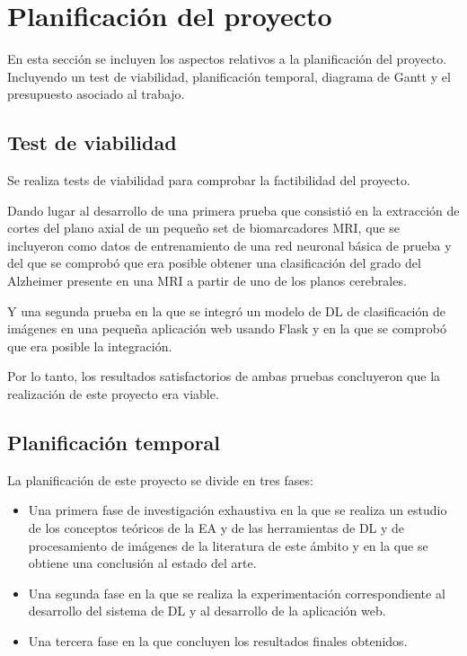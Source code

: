 \chapter{Planificación del proyecto}\label{ch:planificacion}
En esta sección se incluyen los aspectos relativos a la planificación del proyecto.
Incluyendo un test de viabilidad, planificación temporal, diagrama de Gantt y el presupuesto asociado al
trabajo.


\section{Test de viabilidad}\label{sec:test-de-viabilidad}
Se realiza tests de viabilidad para comprobar la factibilidad del proyecto.

Dando lugar al desarrollo de una primera prueba que consistió en la extracción de cortes del plano axial de un pequeño
set de biomarcadores MRI, que se incluyeron como datos de entrenamiento de una red neuronal básica de prueba y del que
se comprobó que era posible obtener una clasificación del grado del Alzheimer presente en una MRI a partir de uno de
los planos cerebrales.

Y una segunda prueba en la que se integró un modelo de DL de clasificación de imágenes en una pequeña aplicación web
usando Flask y en la que se comprobó que era posible la integración.

Por lo tanto, los resultados satisfactorios de ambas pruebas concluyeron que la realización de este proyecto era viable.


\section{Planificación temporal}\label{sec:planificacion-temporal}
La planificación de este proyecto se divide en tres fases:
\begin{itemize}
    \item Una primera fase de investigación exhaustiva en la que se realiza un estudio de los conceptos teóricos de la
    EA y de las herramientas de DL y de procesamiento de imágenes de la literatura de este ámbito y en la que se obtiene
    una conclusión al estado del arte.
    \item Una segunda fase en la que se realiza la experimentación correspondiente al desarrollo del sistema de DL y al
    desarrollo de la aplicación web.
    \item Una tercera fase en la que concluyen los resultados finales obtenidos. \\
\end{itemize}

